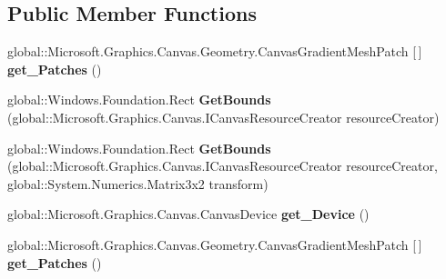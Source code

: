 \subsection*{Public Member Functions}
\begin{DoxyCompactItemize}
\item 
\mbox{\label{interface_microsoft_1_1_graphics_1_1_canvas_1_1_geometry_1_1_i_canvas_gradient_mesh_a0c0aede79e9bd4a377b1c963cc2ebdc2}} 
global\+::\+Microsoft.\+Graphics.\+Canvas.\+Geometry.\+Canvas\+Gradient\+Mesh\+Patch \mbox{[}$\,$\mbox{]} {\bfseries get\+\_\+\+Patches} ()
\item 
\mbox{\label{interface_microsoft_1_1_graphics_1_1_canvas_1_1_geometry_1_1_i_canvas_gradient_mesh_a60495941d0df177b0c3211c88f21395d}} 
global\+::\+Windows.\+Foundation.\+Rect {\bfseries Get\+Bounds} (global\+::\+Microsoft.\+Graphics.\+Canvas.\+I\+Canvas\+Resource\+Creator resource\+Creator)
\item 
\mbox{\label{interface_microsoft_1_1_graphics_1_1_canvas_1_1_geometry_1_1_i_canvas_gradient_mesh_af752134439dc779ececd8c807383c753}} 
global\+::\+Windows.\+Foundation.\+Rect {\bfseries Get\+Bounds} (global\+::\+Microsoft.\+Graphics.\+Canvas.\+I\+Canvas\+Resource\+Creator resource\+Creator, global\+::\+System.\+Numerics.\+Matrix3x2 transform)
\item 
\mbox{\label{interface_microsoft_1_1_graphics_1_1_canvas_1_1_geometry_1_1_i_canvas_gradient_mesh_a68a310ad09ab7904bbc54422f689cf20}} 
global\+::\+Microsoft.\+Graphics.\+Canvas.\+Canvas\+Device {\bfseries get\+\_\+\+Device} ()
\item 
\mbox{\label{interface_microsoft_1_1_graphics_1_1_canvas_1_1_geometry_1_1_i_canvas_gradient_mesh_a0c0aede79e9bd4a377b1c963cc2ebdc2}} 
global\+::\+Microsoft.\+Graphics.\+Canvas.\+Geometry.\+Canvas\+Gradient\+Mesh\+Patch \mbox{[}$\,$\mbox{]} {\bfseries get\+\_\+\+Patches} ()
\item 

\end{DoxyCompactItemize}
